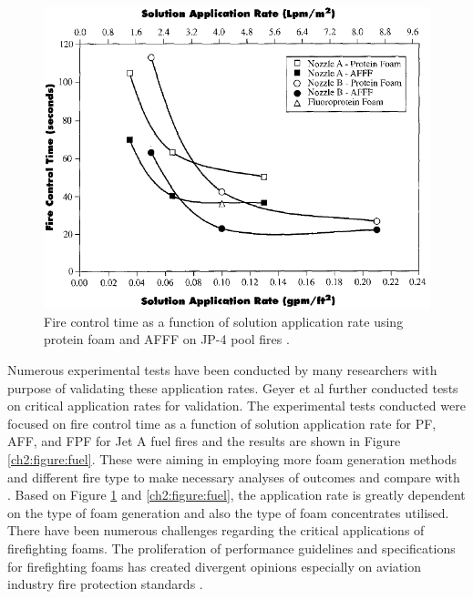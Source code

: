 \documentclass[12pt]{report}
\begin{document}
\begin{figure}[H]
    \centering
    \includegraphics[width=\textwidth]{fire_control_time_pool_fires.png}
    \caption{Fire control time as a function of solution application rate using protein foam and AFFF on JP-4 pool fires \cite{geyer1972evaluation}.}
    \label{ch2:figure:pool}
\end{figure}

Numerous experimental tests have been conducted by many researchers with purpose of validating these application rates. Geyer et al \cite{geyer1979comparative} further conducted tests on critical application rates for validation. The experimental tests conducted were focused on fire control time as a function of solution application rate for PF, AFF, and FPF for Jet A fuel fires and the results are shown in Figure \ref{ch2:figure:fuel}. These were aiming in employing more foam generation methods and different fire type to make necessary analyses of outcomes and compare with \cite{geyer1972evaluation}. Based on Figure \ref{ch2:figure:pool} and \ref{ch2:figure:fuel}, the application rate is greatly dependent on the type of foam generation and also the type of foam concentrates utilised. There have been numerous challenges regarding the critical applications of firefighting foams. The proliferation of performance guidelines and specifications for firefighting foams has created divergent opinions especially on aviation industry fire protection standards \cite{scheffey1995evaluating}.
\end{document}
